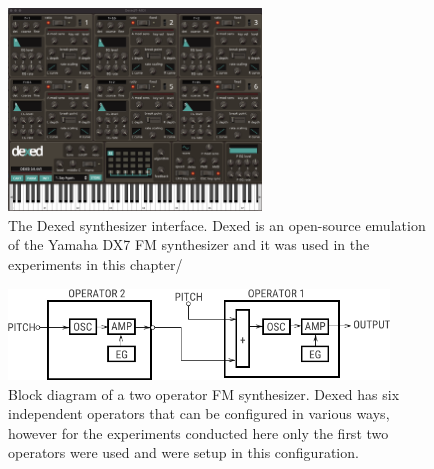 \begin{figure}[ht]
    \centering
    \includegraphics[width=0.6\textwidth]{figures/spiegelib/dexed.png}
    \caption{The Dexed synthesizer interface. Dexed is an open-source emulation of the Yamaha DX7 FM synthesizer and it was used in the experiments in this chapter/}
    \label{fig:dexed}
\end{figure}

\begin{figure}[ht]
    \centering
    \includegraphics[width=0.9\textwidth]{figures/spiegelib/two_op_fm_block.png}
    \caption{Block diagram of a two operator FM synthesizer. Dexed has six independent operators that can be configured in various ways, however for the experiments conducted here only the first two operators were used and were setup in this configuration.}
    \label{fig:two_op_fm_block}
\end{figure}

